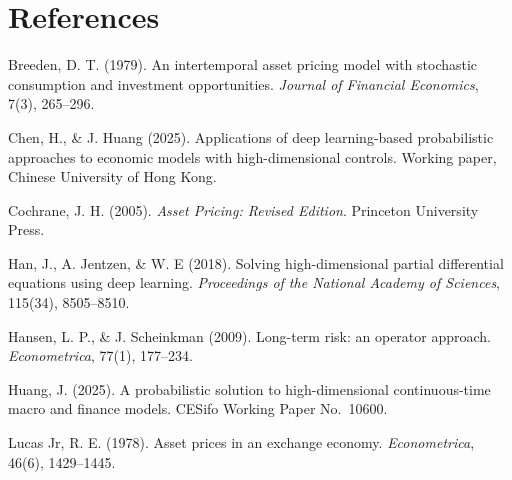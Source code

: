 ﻿\documentclass[11pt,letterpaper,oneside]{article}
\numberwithin{equation}{section}
\newcommand{\1}{\mathbf{1}}
\begin{document}
\section*{References}
\begin{thebibliography}{99}\small
{} Breeden, D. T. (1979).
An intertemporal asset pricing model with stochastic consumption and investment opportunities.
\emph{Journal of Financial Economics}, 7(3), 265--296.

 Chen, H., \& J. Huang (2025).
Applications of deep learning-based probabilistic approaches to economic models with high-dimensional controls.
Working paper, Chinese University of Hong Kong.

 Cochrane, J. H. (2005).
\emph{Asset Pricing: Revised Edition}.
Princeton University Press.

 Han, J., A. Jentzen, \& W. E (2018).
Solving high-dimensional partial differential equations using deep learning.
\emph{Proceedings of the National Academy of Sciences}, 115(34), 8505--8510.

 Hansen, L. P., \& J. Scheinkman (2009).
Long-term risk: an operator approach.
\emph{Econometrica}, 77(1), 177--234.

 Huang, J. (2025).
A probabilistic solution to high-dimensional continuous-time macro and finance models.
CESifo Working Paper No.~10600.

 Lucas Jr, R. E. (1978).
Asset prices in an exchange economy.
\emph{Econometrica}, 46(6), 1429--1445.
\end{thebibliography}
\end{document}
